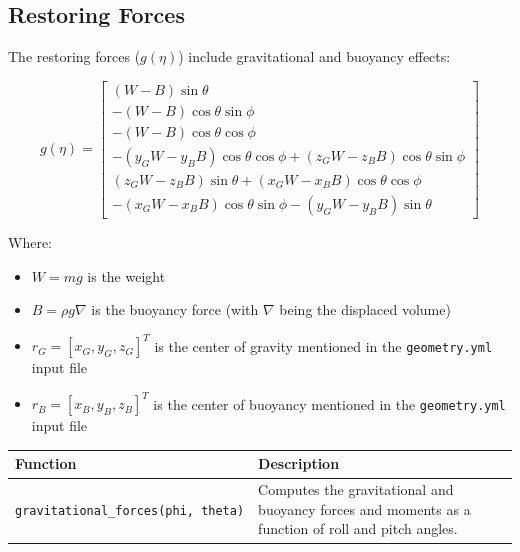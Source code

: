 \documentclass[
  letterpaper,
  DIV=11,
  numbers=noendperiod]{scrreprt}
\providecommand{\tightlist}{%
  \setlength{\itemsep}{0pt}\setlength{\parskip}{0pt}}\usepackage{longtable,booktabs,array}
\begin{document}
\subsection*{Restoring Forces}\label{restoring-forces}

The restoring forces (\(g(\eta)\)) include gravitational and buoyancy
effects:

\[g(\eta) = \begin{bmatrix} 
(W - B) \sin \theta \\ 
-(W - B) \cos \theta \sin \phi \\ 
-(W - B) \cos \theta \cos \phi \\ 
-(y_G W - y_B B) \cos \theta \cos \phi + (z_G W - z_B B) \cos \theta \sin \phi \\ 
(z_G W - z_B B) \sin \theta + (x_G W - x_B B) \cos \theta \cos \phi \\ 
-(x_G W - x_B B) \cos \theta \sin \phi - (y_G W - y_B B) \sin \theta 
\end{bmatrix}\]

Where:

\begin{itemize}
\tightlist
\item
  \(W = mg\) is the weight
\item
  \(B = \rho g \nabla\) is the buoyancy force (with \(\nabla\) being the
  displaced volume)
\item
  \(r_G = [x_G, y_G, z_G]^T\) is the center of gravity mentioned in the
  \texttt{geometry.yml} input file
\item
  \(r_B = [x_B, y_B, z_B]^T\) is the center of buoyancy mentioned in the
  \texttt{geometry.yml} input file
\end{itemize}

\begin{longtable}[]{@{}
  >{\raggedright\arraybackslash}p{}
  >{\raggedright\arraybackslash}p{}@{}}
\toprule\noalign{}
\begin{minipage}[b]{\linewidth}\raggedright
Function
\end{minipage} & \begin{minipage}[b]{\linewidth}\raggedright
Description
\end{minipage} \\
\midrule\noalign{}
\endhead
\bottomrule\noalign{}
\endlastfoot
\texttt{gravitational\_forces(phi,\ theta)} & Computes the gravitational
and buoyancy forces and moments as a function of roll and pitch
angles. \\
\end{longtable}
\end{document}
